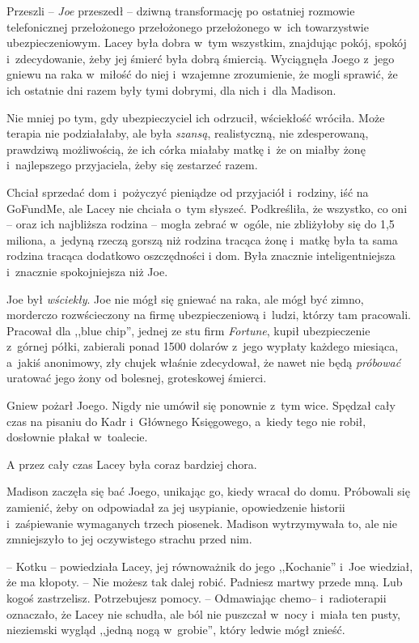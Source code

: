 \documentclass[oneside,polish,11pt,sfheadings]{mwbk}
\begin{document}
Przeszli -- \textit{Joe} przeszedł -- dziwną transformację po ostatniej
rozmowie telefonicznej przełożonego przełożonego przełożonego w~ich
towarzystwie ubezpieczeniowym. Lacey była dobra w~tym wszystkim,
znajdując pokój, spokój i~zdecydowanie, żeby jej śmierć była dobrą
śmiercią. Wyciągnęła Joego z~jego gniewu na raka w~miłość do niej i~wzajemne zrozumienie, że mogli sprawić, że ich ostatnie dni razem były
tymi dobrymi, dla nich i~dla Madison.

Nie mniej po tym, gdy ubezpieczyciel ich odrzucił, wściekłość wróciła.
Może terapia nie podziałałaby, ale była \textit{szansą}, realistyczną, nie
zdesperowaną, prawdziwą możliwością, że ich córka miałaby matkę i~że on
miałby żonę i~najlepszego przyjaciela, żeby się zestarzeć razem.

Chciał sprzedać dom i~pożyczyć pieniądze od przyjaciół i~rodziny, iść na
GoFundMe, ale Lacey nie chciała o~tym słyszeć. Podkreśliła, że wszystko,
co oni -- oraz ich najbliższa rodzina -- mogła zebrać w~ogóle, nie
zbliżyłoby się do 1,5 miliona, a~jedyną rzeczą gorszą niż rodzina
tracąca żonę i~matkę była ta sama rodzina tracąca dodatkowo oszczędności
i dom. Była znacznie inteligentniejsza i~znacznie spokojniejsza niż Joe.

Joe był \textit{wściekły}. Joe nie mógł się gniewać na raka, ale mógł być
zimno, morderczo rozwścieczony na firmę ubezpieczeniową i~ludzi, którzy
tam pracowali. Pracował dla ,,blue chip'', jednej ze stu firm
\textit{Fortune}, kupił ubezpieczenie z~górnej półki, zabierali ponad 1500
dolarów z~jego wypłaty każdego miesiąca, a~jakiś anonimowy, zły chujek
właśnie zdecydował, że nawet nie będą \textit{próbować} uratować jego żony
od bolesnej, groteskowej śmierci.

Gniew pożarł Joego. Nigdy nie umówił się ponownie z~tym wice. Spędzał
cały czas na pisaniu do Kadr i~Głównego Księgowego, a~kiedy tego nie
robił, dosłownie płakał w~toalecie.

A przez cały czas Lacey była coraz bardziej chora.

Madison zaczęła się bać Joego, unikając go, kiedy wracał do domu.
Próbowali się zamienić, żeby on odpowiadał za jej usypianie,
opowiedzenie historii i~zaśpiewanie wymaganych trzech piosenek. Madison
wytrzymywała to, ale nie zmniejszyło to jej oczywistego strachu przed
nim.

-- Kotku -- powiedziała Lacey, jej równoważnik do jego ,,Kochanie'' i~Joe
wiedział, że ma kłopoty. -- Nie możesz tak dalej robić. Padniesz martwy
przede mną. Lub kogoś zastrzelisz. Potrzebujesz pomocy. -- Odmawiając
chemo-- i~radioterapii oznaczało, że Lacey nie schudła, ale ból nie
puszczał w~nocy i~miała ten pusty, nieziemski wygląd ,,jedną nogą w~grobie'', który ledwie mógł znieść.
\end{document}
